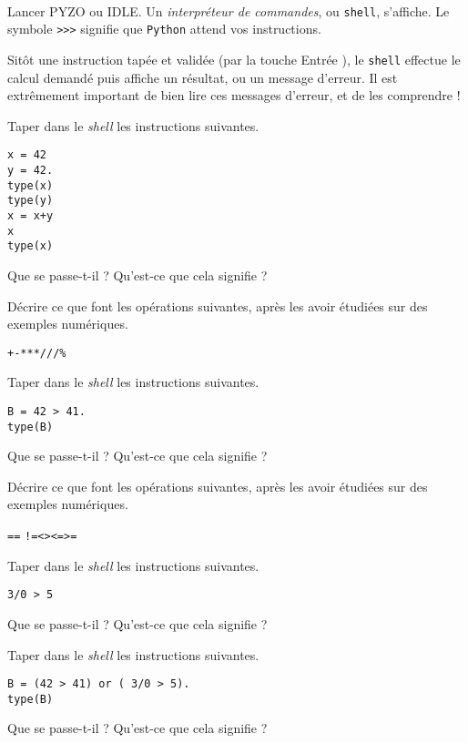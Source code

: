 \exer{[ARCHI-002]}
\setcounter{numques}{0}~\\


Lancer PYZO ou IDLE. Un \emph{interpréteur de commandes}, ou \texttt{shell}, s'affiche. 
Le symbole \texttt{>}\texttt{>}\texttt{>} signifie que \texttt{Python}{} attend vos instructions. 

Sitôt une instruction tapée et validée (par la touche \og Entrée \fg{}), le \texttt{shell} effectue le calcul demandé puis affiche un résultat, ou un message d'erreur. 
Il est extrêmement important de bien lire ces messages d'erreur, et de les comprendre ! 

\medskip{}

\question{} Taper dans le \emph{shell} les instructions suivantes. 
\begin{lstlisting}
x = 42
y = 42.
type(x)
type(y)
x = x+y
x
type(x)
\end{lstlisting}
Que se passe-t-il ? Qu'est-ce que cela signifie ?

\medskip{}

\question{} Décrire ce que font les opérations suivantes, après les avoir étudiées sur des exemples numériques.
\begin{center}
  \texttt{+}\qquad \texttt{-}\qquad \texttt{*}\qquad \texttt{**}\qquad \texttt{/}\qquad \texttt{//}\qquad \texttt{\%}
\end{center}


\question{} Taper dans le \emph{shell} les instructions suivantes. 
\begin{lstlisting}
B = 42 > 41.
type(B)
\end{lstlisting}
Que se passe-t-il ? Qu'est-ce que cela signifie ?

\medskip{}

\question{} Décrire ce que font les opérations suivantes, après les avoir étudiées sur des exemples numériques.
\begin{center}
  \texttt{==} {} \qquad{} \texttt{!=}\qquad\texttt{<}\qquad\texttt{>}\qquad\texttt{<=}\qquad\texttt{>=}
\end{center}

\medskip{}

\question{} Taper dans le \emph{shell} les instructions suivantes. 
\begin{lstlisting}
3/0 > 5
\end{lstlisting}
Que se passe-t-il ? Qu'est-ce que cela signifie ?
\medskip{}

\question{} Taper dans le \emph{shell} les instructions suivantes. 
\begin{lstlisting}
B = (42 > 41) or ( 3/0 > 5).
type(B)
\end{lstlisting}
Que se passe-t-il ? Qu'est-ce que cela signifie ?

